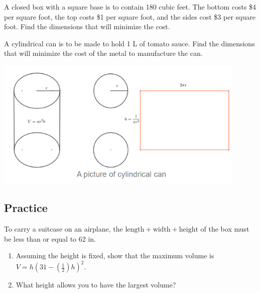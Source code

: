 \begin{example}

A closed box with a square base is to contain 180 cubic feet. The bottom
costs \$4 per square foot, the top costs \$1 per square foot, and the
sides cost \$3 per square foot. Find the dimensions that will minimize
the cost.

\end{example}
\vspace*{6\baselineskip}

\begin{example}

A cylindrical can is to be made to hold 1 L of tomato sauce. Find the
dimensions that will minimize the cost of the metal to manufacture the
can.

\includegraphics[width=0.9\textwidth]{img/image-20200420234447905.png}

\end{example}
\vspace*{6\baselineskip}

\subsection{Practice}

\begin{exercise}

To carry a suitcase on an airplane, the
\(\text{length} + \text{width} + \text{height}\) of the box must be less
than or equal to 62 in.

\begin{enumerate}
\item
  Assuming the height is fixed, show that the maximum volume is
  \(V=h(31 - (\frac{1}{2})h)^2.\)
\item
  What height allows you to have the largest volume?
\end{enumerate}

\end{exercise}

